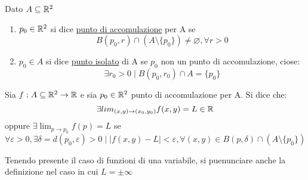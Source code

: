 \begin{definition}
  Dato $A \subseteq \mathbb{R}^2$
  \begin{enumerate}
    \item $p_0 \in \mathbb{R}^2$ si dice \underline{punto di accomulazione} per A se 
          $$B(p_0,r) \cap (A\setminus \{p_0\}) \not = \varnothing, \forall r > 0$$
    \item $p_0 \in A$ si dice \underline{punto isolato} di A se $p_0$ non \ace un punto di 
          accomulazione, cio\ace se:
          $$\exists r_0 > 0 \mid B(p_0,r_0) \cap A = \{p_0\}$$
  \end{enumerate}
\end{definition}
\begin{definition}
  Sia $f: A \subseteq \mathbb{R}^2 \to \mathbb{R}$ e sia $p_0 \in \mathbb{R}^2$ punto di accomulazione per A. Si dice che:
  $$\exists lim_{(x,y)\to (x_0,y_0)} f(x,y) = L \in \mathbb{R}$$
  oppure $\exists \lim_{p \to p_0} f(p) = L$ se 
  $$\forall \varepsilon > 0, \exists \delta = d(p_0,\varepsilon) > 0 \mid 
  \lvert f(x,y)-L\rvert < \varepsilon, \forall (x,y) \in B(p,\delta) \cap (A \setminus \{p_0\})$$
\end{definition}
\begin{osservazione}
  Tenendo presente il caso di funzioni di una variabile, si pu\aco enunciare anche la definizione nel caso in cui $L = \pm \infty$
\end{osservazione}
